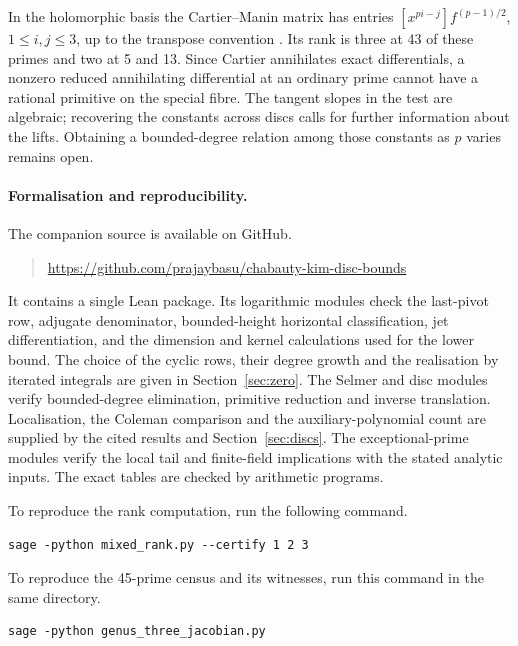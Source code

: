 In the holomorphic basis the Cartier--Manin matrix has entries
\([x^{pi-j}]f^{(p-1)/2}\), \(1\le i,j\le3\), up to the transpose
convention \cite{AchterHowe}. Its rank is three at 43 of these primes
and two at 5 and 13. Since Cartier annihilates exact differentials, a
nonzero reduced annihilating differential at an ordinary prime cannot
have a rational primitive on the special fibre. The tangent slopes in
the test are algebraic; recovering the constants across discs calls for
further information about the lifts. Obtaining a bounded-degree relation
among those constants as \(p\) varies remains open.

\paragraph{Formalisation and reproducibility.}
The companion source is available on GitHub.
\begin{quote}
\url{https://github.com/prajaybasu/chabauty-kim-disc-bounds}
\end{quote}
It contains a single Lean package. Its logarithmic modules check the last-pivot row, adjugate denominator, bounded-height
horizontal classification, jet differentiation, and the dimension and
kernel calculations used for the lower bound. The choice of the cyclic
rows, their degree growth and the realisation by iterated integrals are
given in Section~\ref{sec:zero}. The Selmer and disc modules verify
bounded-degree elimination, primitive reduction and inverse translation.
Localisation, the Coleman comparison and the auxiliary-polynomial count
are supplied by the cited results and Section~\ref{sec:discs}.
The exceptional-prime modules verify the local tail and finite-field
implications with the stated analytic inputs. The exact tables are
checked by arithmetic programs.

\begin{samepage}
To reproduce the rank computation, run the following command.\par\nopagebreak
\begin{verbatim}
sage -python mixed_rank.py --certify 1 2 3
\end{verbatim}
\end{samepage}
To reproduce the 45-prime census and its witnesses, run this command in
the same directory.
\begin{verbatim}
sage -python genus_three_jacobian.py
\end{verbatim}
